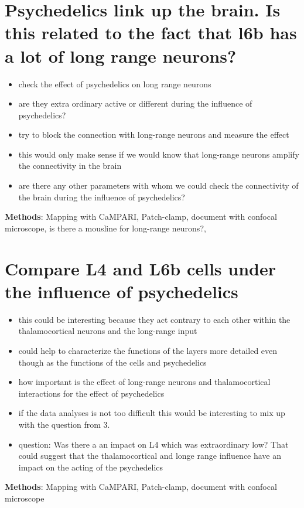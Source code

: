\documentclass[12pt, a4paper, openany]{article}
\begin{document}
\section{Psychedelics link up the brain. Is this related to the fact that l6b has a lot of long range neurons?}
\begin{itemize}
\setlength\itemsep{0em}
\item check the effect of psychedelics on long range neurons 
\item are they extra ordinary active or different during the influence of psychedelics?
\item try to block the connection with long-range neurons and measure the effect 
\item this would only make sense if we would know that long-range neurons amplify the connectivity in the brain 
\item are there any other parameters with whom we could check the connectivity of the brain during the influence of psychedelics? 

\end{itemize} 
\textbf{Methods}:  Mapping with CaMPARI, Patch-clamp, document with confocal microscope, is there a mousline for long-range neurons?, 

\section{Compare L4 and L6b cells under the influence of psychedelics}
\begin{itemize}
\setlength\itemsep{0em}
\item this could be interesting because they act contrary to each other within the thalamocortical neurons and the long-range input 
\item could help to characterize the functions of the layers more detailed even though as the functions of the cells and psychedelics
\item how important is the effect of long-range neurons and thalamocortical interactions for the effect of psychedelics 
\item if the data analyses is not too difficult this would be interesting to mix up with the question from 3.
\item question: Was there a an impact on L4 which was extraordinary low? That could suggest that the thalamocortical and longe range influence have an impact on the acting of the psychedelics
\end {itemize}
\textbf{Methods}:  Mapping with CaMPARI, Patch-clamp, document with confocal microscope
\end{document}

